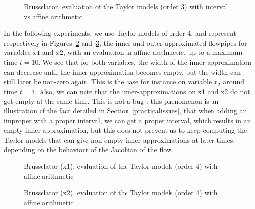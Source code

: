 \begin{figure}[htbp]
\begin{center}
\end{center}
\caption{Brusselator, evaluation of the Taylor models (order 3) with interval vs affine arithmetic \label{fig:brusselator_order3_t1}}
\end{figure}

In the following experiments, we use Taylor models of order 4, and represent respectively in Figures~\ref{fig:brusselator_order4_x1_t10} and~\ref{fig:brusselator_order4_x2_t10}, the inner and outer approximated flowpipes for variables $x1$ and $x2$, with an evaluation in affine arithmetic, up to a maximum time $t=10$. We see that for both variables, the width of the inner-approximation can decrease until the inner-approximation becomes empty, but the width can still later be non-zero again. This is the case for instance on variable $x_2$ around time $t=4$. Also, we can note that the inner-approximations on x1 and x2 do not get empty at the same time. 
This is not a bug : this phenomenon is an illustration of the fact detailed in Section~\ref{practicalissues}, that when adding an improper with a proper interval, we can get a proper interval, which results in an empty inner-approximation, but this does not prevent us to keep computing the Taylor models that can give non-empty inner-approximations at later times, depending on the behaviour of the Jacobian of the flow.    

\begin{figure}[htbp]
\begin{center}
\end{center}
\caption{Brusselator (x1), evaluation of the Taylor models (order 4) with affine arithmetic \label{fig:brusselator_order4_x1_t10}}
\end{figure}

\begin{figure}[htbp]
\begin{center}
\end{center}
\caption{Brusselator (x2), evaluation of the Taylor models (order 4) with affine arithmetic \label{fig:brusselator_order4_x2_t10}}
\end{figure}


